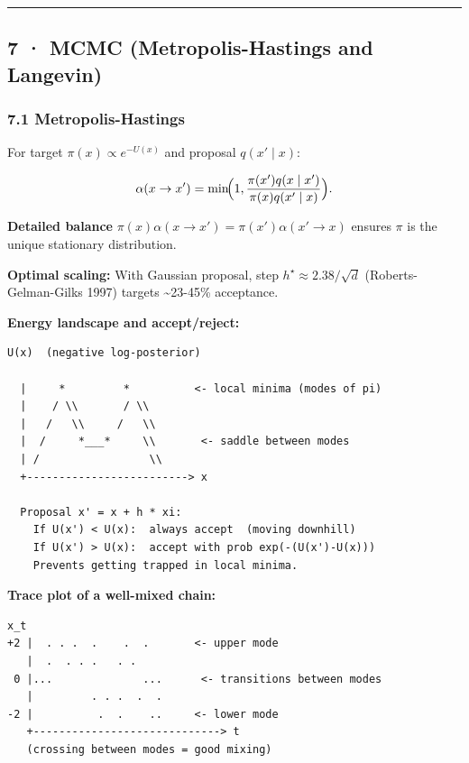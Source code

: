\documentclass[11pt,a4paper]{article}
\begin{document}
\begin{center}\rule{0.5\linewidth}{0.5pt}\end{center}

\subsection{7 · MCMC (Metropolis-Hastings and Langevin)}\label{mcmc-metropolis-hastings-and-langevin}

\subsubsection{7.1 Metropolis-Hastings}\label{metropolis-hastings}

For target \(\pi(x) \propto e^{-U(x)}\) and proposal \(q(x'\mid x)\):

\[\alpha(x\to x') = \min\!\Bigl(1, \frac{\pi(x')q(x\mid x')}{\pi(x)q(x'\mid x)}\Bigr).\]

\textbf{Detailed balance} \(\pi(x)\alpha(x\to x') = \pi(x')\alpha(x'\to x)\) ensures \(\pi\) is the unique stationary distribution.

\textbf{Optimal scaling:} With Gaussian proposal, step \(h^\star \approx 2.38/\sqrt{d}\) (Roberts-Gelman-Gilks 1997) targets \textasciitilde23-45\% acceptance.

\textbf{Energy landscape and accept/reject:}

\begin{verbatim}
U(x)  (negative log-posterior)

  |     *         *          <- local minima (modes of pi)
  |    / \\       / \\
  |   /   \\     /   \\
  |  /     *___*     \\       <- saddle between modes
  | /                 \\
  +-------------------------> x

  Proposal x' = x + h * xi:
    If U(x') < U(x):  always accept  (moving downhill)
    If U(x') > U(x):  accept with prob exp(-(U(x')-U(x)))
    Prevents getting trapped in local minima.
\end{verbatim}

\textbf{Trace plot of a well-mixed chain:}

\begin{verbatim}
x_t
+2 |  . . .  .    .  .       <- upper mode
   |  .  . . .   . .
 0 |...              ...      <- transitions between modes
   |         . . .  .  .
-2 |          .  .    ..     <- lower mode
   +-----------------------------> t
   (crossing between modes = good mixing)
\end{verbatim}
\end{document}
